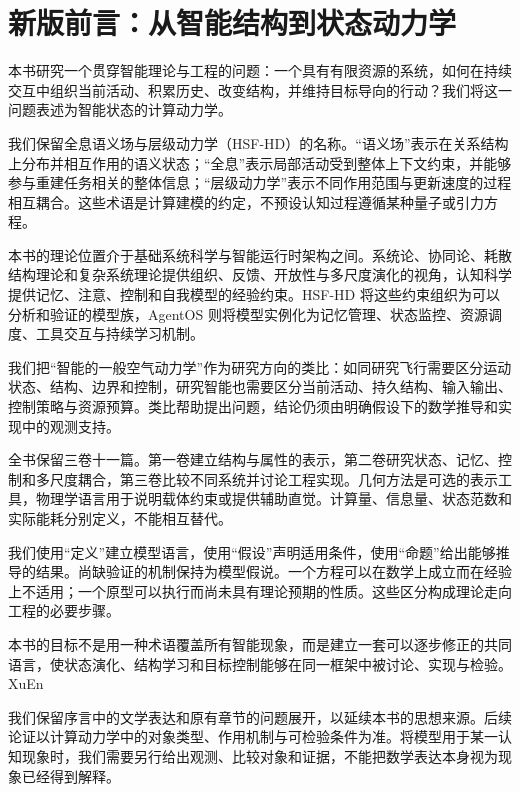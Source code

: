 \chapter*{新版前言：从智能结构到状态动力学}
本书研究一个贯穿智能理论与工程的问题：一个具有有限资源的系统，如何在持续交互中组织当前活动、积累历史、改变结构，并维持目标导向的行动？我们将这一问题表述为智能状态的计算动力学。

我们保留全息语义场与层级动力学（HSF-HD）的名称。“语义场”表示在关系结构上分布并相互作用的语义状态；“全息”表示局部活动受到整体上下文约束，并能够参与重建任务相关的整体信息；“层级动力学”表示不同作用范围与更新速度的过程相互耦合。这些术语是计算建模的约定，不预设认知过程遵循某种量子或引力方程。

本书的理论位置介于基础系统科学与智能运行时架构之间。系统论、协同论、耗散结构理论和复杂系统理论提供组织、反馈、开放性与多尺度演化的视角，认知科学提供记忆、注意、控制和自我模型的经验约束。HSF-HD 将这些约束组织为可以分析和验证的模型族，AgentOS 则将模型实例化为记忆管理、状态监控、资源调度、工具交互与持续学习机制。

我们把“智能的一般空气动力学”作为研究方向的类比：如同研究飞行需要区分运动状态、结构、边界和控制，研究智能也需要区分当前活动、持久结构、输入输出、控制策略与资源预算。类比帮助提出问题，结论仍须由明确假设下的数学推导和实现中的观测支持。

全书保留三卷十一篇。第一卷建立结构与属性的表示，第二卷研究状态、记忆、控制和多尺度耦合，第三卷比较不同系统并讨论工程实现。几何方法是可选的表示工具，物理学语言用于说明载体约束或提供辅助直觉。计算量、信息量、状态范数和实际能耗分别定义，不能相互替代。

我们使用“定义”建立模型语言，使用“假设”声明适用条件，使用“命题”给出能够推导的结果。尚缺验证的机制保持为模型假说。一个方程可以在数学上成立而在经验上不适用；一个原型可以执行而尚未具有理论预期的性质。这些区分构成理论走向工程的必要步骤。

本书的目标不是用一种术语覆盖所有智能现象，而是建立一套可以逐步修正的共同语言，使状态演化、结构学习和目标控制能够在同一框架中被讨论、实现与检验。
\hfill XuEn

我们保留序言中的文学表达和原有章节的问题展开，以延续本书的思想来源。后续论证以计算动力学中的对象类型、作用机制与可检验条件为准。将模型用于某一认知现象时，我们需要另行给出观测、比较对象和证据，不能把数学表达本身视为现象已经得到解释。
